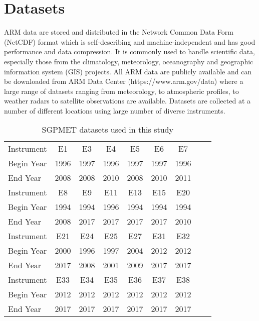 \section{Datasets}
ARM data are stored and distributed in the Network Common Data Form (NetCDF) format which
is self-describing and machine-independent \cite{rew1990netcdf, NetCDF}
and has good performance and data compression. It is commonly used to
handle scientific data, especially those from the climatology,
meteorology, oceanography and geographic information system (GIS) projects. 
All ARM data are publicly available and can be downloaded from ARM Data Center
(https://www.arm.gov/data) where a large range of datasets ranging  
from meteorology, to atmospheric profiles, to weather radars to
satellite observations are available. Datasets are collected at a number
of different locations using large number of diverse
instruments. %

\begin{table}[ht]
\caption{SGPMET datasets used in this study}
\label{tab:datasets}
\centering
\begin{tabular}{|l|c|c|c|c|c|c|c|c|}
\hline
Instrument & E1 & E3 & E4 & E5 & E6 & E7\\
Begin Year & 1996 & 1997 & 1996 & 1997 & 1997 & 1996\\
End Year & 2008 & 2008 & 2010 & 2008 & 2010 & 2011\\
\hline
Instrument & E8 & E9 & E11 & E13 & E15 & E20\\
Begin Year & 1994 & 1994 & 1996 & 1994 & 1994 & 1994\\
End Year & 2008 & 2017 & 2017 & 2017 & 2017 & 2010\\
\hline
Instrument & E21 & E24 & E25 & E27 & E31 & E32\\
Begin Year & 2000 & 1996 & 1997 & 2004 & 2012 & 2012\\
End Year & 2017 & 2008 & 2001 & 2009 & 2017 & 2017\\
\hline
Instrument & E33 & E34 & E35 & E36 & E37 & E38\\
Begin Year & 2012 & 2012 & 2012 & 2012 & 2012 & 2012\\
End Year & 2017 & 2017 & 2017 & 2017 & 2017 & 2017\\
\hline
\end{tabular}
\end{table}

